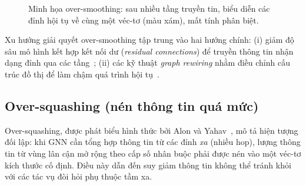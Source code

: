 \begin{figure}[htbp]
\centering
{}
\caption{Minh họa over-smoothing: sau nhiều tầng truyền tin, biểu diễn các đỉnh hội tụ về cùng một véc-tơ (màu xám), mất tính phân biệt.}
\label{fig:oversmoothing}
\end{figure}

Xu hướng giải quyết over-smoothing tập trung vào hai hướng chính: (i) giảm độ sâu mô hình kết hợp kết nối dư (\textit{residual connections}) để truyền thông tin nhận dạng đỉnh qua các tầng~\cite{Li2018DeeperInsights}; (ii) các kỹ thuật \textit{graph rewiring} nhằm điều chỉnh cấu trúc đồ thị để làm chậm quá trình hội tụ~\cite{Topping2022GraphRewiring}.

\subsection{Over-squashing (nén thông tin quá mức)}

Over-squashing, được phát biểu hình thức bởi Alon và Yahav~\cite{Alon2021Bottleneck}, mô tả hiện tượng đối lập: khi GNN cần tổng hợp thông tin từ các đỉnh \textit{xa} (nhiều hop), lượng thông tin từ vùng lân cận mở rộng theo cấp số nhân buộc phải được nén vào một véc-tơ kích thước cố định. Điều này dẫn đến suy giảm thông tin không thể tránh khỏi với các tác vụ đòi hỏi phụ thuộc tầm xa.

